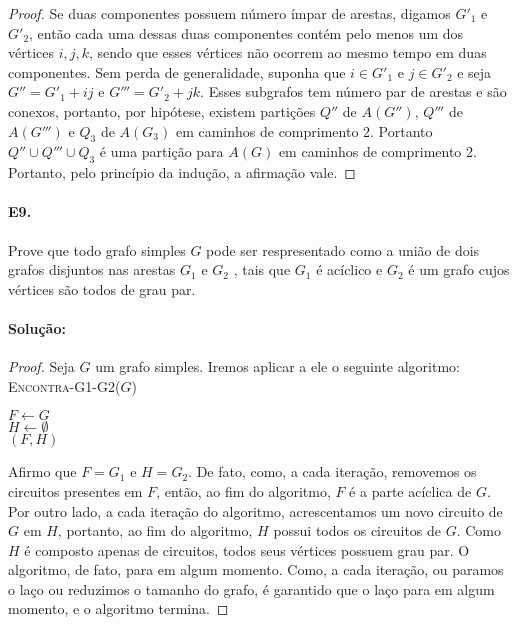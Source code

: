 \documentclass[11pt,a4paper,notitlepage]{exam}
\newcommand\Recebe{\leftarrow}
\begin{document}
\begin{proof}
  Se duas componentes possuem número ímpar de arestas, digamos $G'_1$ e $G'_2$, então cada uma dessas duas componentes contém pelo menos um dos vértices $i,j,k$, sendo que esses vértices não ocorrem ao mesmo tempo em duas componentes. Sem perda de generalidade, suponha que $i \in G'_1$ e $j \in G'_2$ e seja $G'' = G'_1 + ij$ e $G''' = G'_2 + jk$. Esses subgrafos tem número par de arestas e são conexos, portanto, por hipótese, existem partições $Q''$ de $A(G'')$, $Q'''$ de $A(G''')$ e $Q_3$ de $A(G_3)$ em caminhos de comprimento 2. Portanto $Q''\cup Q'''\cup Q_3$ é uma partição para $A(G)$ em caminhos de comprimento 2.\\
  Portanto, pelo princípio da indução, a afirmação vale.
\end{proof}


\paragraph{E9.}Prove que todo grafo simples $G$ pode ser respresentado como a união de dois grafos disjuntos
nas arestas $G_1$ e $G_2$ , tais que $G_1$ é acíclico e $G_2$ é um grafo cujos vértices são todos de grau
par.
\paragraph*{Solução: }
\begin{proof}
  Seja $G$ um grafo simples. Iremos aplicar a ele o seguinte algoritmo:\\

  \SetAlgoNoLine
  \textsc{Encontra-G1-G2}($G$)\\
  \begin{algorithm}[H]
    $F \Recebe G$\\
    $H \Recebe \emptyset$\\
    \Enqto{$F$ tem algum circuito $C$}{
      $F \Recebe F \backslash C$ \\
      $H \Recebe H \cup C$\\
    }
    \Devolva $(F, H)$
  \end{algorithm}
  Afirmo que $F = G_1$ e $H = G_2$. De fato, como, a cada iteração, removemos os circuitos presentes em $F$, então, ao fim do algoritmo, $F$ é a parte acíclica de $G$. Por outro lado, a cada iteração do algoritmo, acrescentamos um novo circuito de $G$ em $H$, portanto, ao fim do algoritmo, $H$ possui todos os circuitos de $G$. Como $H$ é composto apenas de circuitos, todos seus vértices possuem grau par. O algoritmo, de fato, para em algum momento. Como, a cada iteração, ou paramos o laço ou reduzimos o tamanho do grafo, é garantido que o laço para em algum momento, e o algoritmo termina.
\end{proof}
\end{document}

